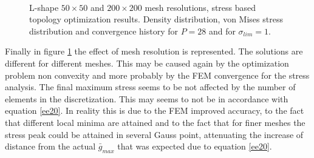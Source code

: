 \begin{figure}[h!]
     \quad
  \\
\caption{L-shape $50\times 50$ and $200\times 200$ mesh resolutions, stress based topology optimization results. Density distribution, von Mises stress distribution and convergence history for $P=28$ and for $\sigma_{lim}=1$. }%
\label{fig.2.20}%
\end{figure}
\clearpage
Finally in figure \ref{fig.2.20} the effect of mesh resolution is represented. The solutions are different for different meshes. This may be caused again by the optimization problem non convexity and more probably by the FEM convergence for the stress analysis. The final maximum stress seems to be not affected by the number of elements in the discretization. This may seems to not be in accordance with equation \ref{ee20}. In reality this is due to the FEM improved accuracy, to the fact that different local minima are attained and to the fact that for finer meshes the stress peak could be attained in several Gauss point, attenuating the increase of distance from the actual $\bar{g}_{max}$ that was expected due to equation \ref{ee20}.
